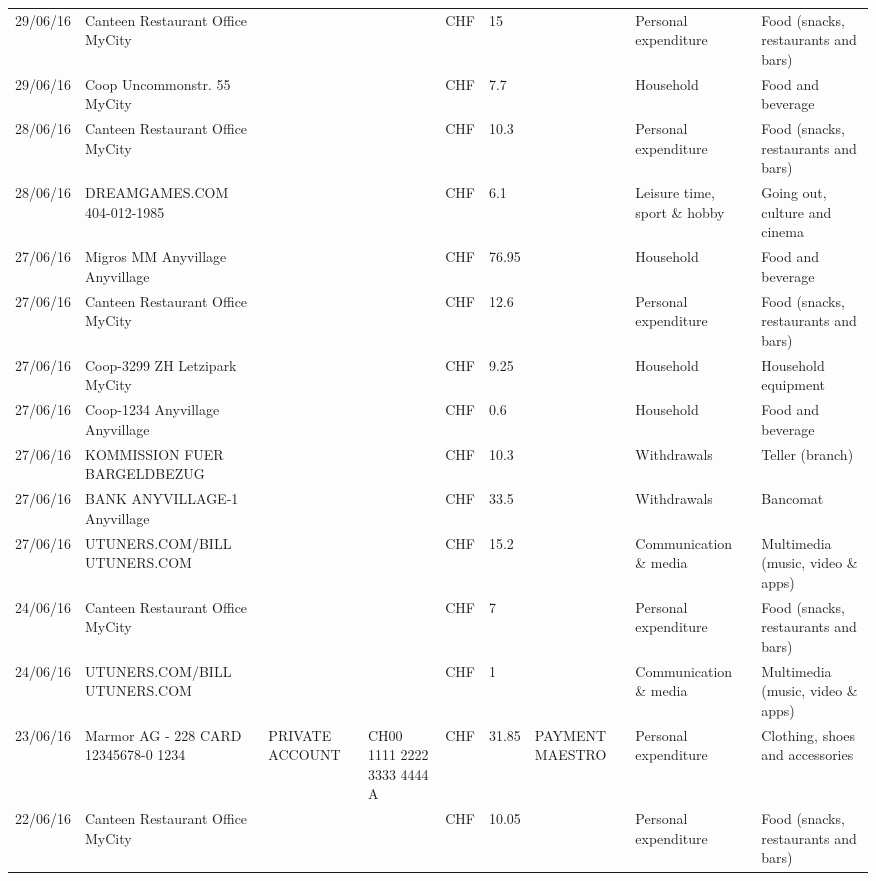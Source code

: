 \begin{landscape}
\begin{table}[t]
\begin{center}
\begin{tabular}{lllllllll}
		29/06/16 & Canteen Restaurant Office      MyCity &       &       & CHF   & 15    &       & Personal expenditure & Food (snacks, restaurants and bars) \\
		29/06/16 & Coop Uncommonstr. 55   MyCity &       &       & CHF   & 7.7   &       & Household & Food and beverage \\
		28/06/16 & Canteen Restaurant Office      MyCity &       &       & CHF   & 10.3  &       & Personal expenditure & Food (snacks, restaurants and bars) \\
		28/06/16 & DREAMGAMES.COM           404-012-1985 &       &       & CHF   & 6.1   &       & Leisure time, sport \& hobby & Going out, culture and cinema \\
		27/06/16 & Migros MM Anyvillage    Anyvillage &       &       & CHF   & 76.95 &       & Household & Food and beverage \\
		27/06/16 & Canteen Restaurant Office      MyCity &       &       & CHF   & 12.6  &       & Personal expenditure & Food (snacks, restaurants and bars) \\
		27/06/16 & Coop-3299 ZH Letzipark   MyCity &       &       & CHF   & 9.25  &       & Household & Household equipment \\
		27/06/16 & Coop-1234 Anyvillage    Anyvillage &       &       & CHF   & 0.6   &       & Household & Food and beverage \\
		27/06/16 & KOMMISSION FUER BARGELDBEZUG &       &       & CHF   & 10.3  &       & Withdrawals & Teller (branch) \\
		27/06/16 & BANK ANYVILLAGE-1        Anyvillage &       &       & CHF   & 33.5  &       & Withdrawals & Bancomat \\
		27/06/16 & UTUNERS.COM/BILL          UTUNERS.COM &       &       & CHF   & 15.2  &       & Communication \& media & Multimedia (music, video \& apps) \\
		24/06/16 & Canteen Restaurant Office      MyCity &       &       & CHF   & 7     &       & Personal expenditure & Food (snacks, restaurants and bars) \\
		24/06/16 & UTUNERS.COM/BILL          UTUNERS.COM &       &       & CHF   & 1     &       & Communication \& media & Multimedia (music, video \& apps) \\
		23/06/16 & Marmor AG - 228 CARD 12345678-0 1234 & PRIVATE ACCOUNT & CH00 1111 2222 3333 4444 A & CHF   & 31.85 & PAYMENT MAESTRO & Personal expenditure & Clothing, shoes and accessories \\
		22/06/16 & Canteen Restaurant Office      MyCity &       &       & CHF   & 10.05 &       & Personal expenditure & Food (snacks, restaurants and bars) \\

\end{tabular}
\end{center}
\end{table}
\end{landscape}

